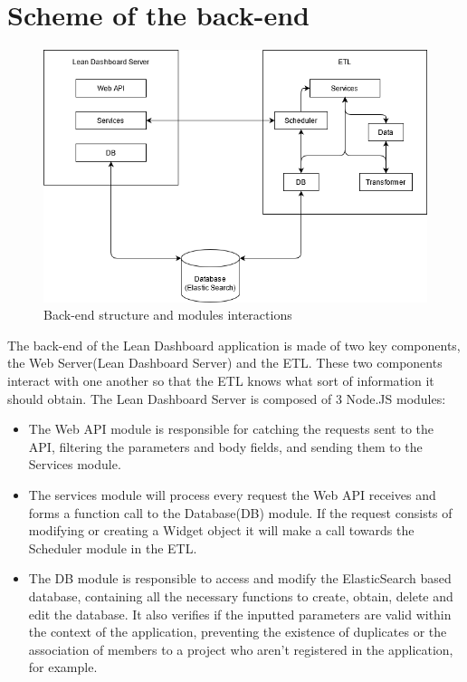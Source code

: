 \documentclass[a4paper,twoside,10pt]{report}
\begin{document}
\section{Scheme of the back-end}
\begin{figure}[h!]
\center
    \includegraphics[width=\textwidth]{arquitetura software.png}
    \caption{Back-end structure and modules interactions}
\end{figure}
The back-end of the Lean Dashboard application is made of two key components, the Web Server(Lean Dashboard Server) and the ETL.
\newline
These two components interact with one another so that the ETL knows what sort of information it should obtain.
\newline
The Lean Dashboard Server is composed of 3 Node.JS\cite{NODE} modules:
\begin{itemize}
  \item The Web API module is responsible for catching the requests sent to the API, filtering the parameters and body fields, and sending them to the Services module.
  \item The services module will process every request the Web API receives and forms a function call to the Database(DB) module. If the request consists of modifying or creating a Widget object it will make a call towards the Scheduler module in the ETL.
  \item The DB module is responsible to access and modify the ElasticSearch based database, containing all the necessary functions to create, obtain, delete and edit the database. It also verifies if the inputted parameters are valid within the context of the application, preventing the existence of duplicates or the association of members to a project who aren't registered in the application, for example.
\end{itemize}
\end{document}
